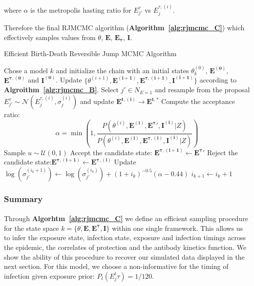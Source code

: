 \documentclass{article}
\begin{document}
where $\alpha$ is the metropolis hasting ratio for $E_{j'}^{\tau}$ vs $E_j^{\tau, (i)}$.

Therefore the final RJMCMC algorithm (\textbf{Algorithm~\ref{alg:rjmcmc_C}}) which effectively samples values from $\theta$, $\mathbf{E}$, $\mathbf{E_\tau}$, $\mathbf{I}$. 

\begin{algorithm}[H]
\caption{Efficient Birth-Death Reversible Jump MCMC Algorithm}
\label{alg:rjmcmc_C}
\begin{algorithmic}[1]
 \State Chose a model $k$ and initialize the chain with an initial states $\theta^{(0)}_{k}$, $\mathbf{E^{(0)}}$, $\mathbf{E^{\tau, (0)}}$ and $\mathbf{I^{(0)}}$.
    	\State Update $\{\theta^{(i + 1)}, \mathbf{E^{(i + 1)}}, \mathbf{E^{\tau, (i + 1)}}, \mathbf{I^{(i + 1)}}\}$ according to \textbf{Algroithm~\ref{alg:rjmcmc_B}}.
        \State Select $j' \in N_{E = 1}$ and resample from the proposal $E_{j'}^{\tau} \sim \mathcal{N}\left(E_{j}^{\tau, (i)}, \sigma^{(i)}_{j}\right)$ and update $\mathbf{E^{t, (i)}} \rightarrow \mathbf{E^{t, *}}$
            \State Compute the acceptance ratio:
        		\[
        		\alpha = \min\left(1, \frac{P(\theta^{(i)}, \mathbf{E^{(i)}}, \mathbf{E^{\tau}'}, \mathbf{I^{(i)}}|Z)}{P(\theta^{(i)}, \mathbf{E^{(i)}}, \mathbf{E^{\tau, (i)}}, \mathbf{I^{(i)}}|Z)} \right)
        			\]
  \State Sample $u \sim \mathcal{U}(0, 1)$
            	\State Accept the candidate state: $\mathbf{E^{\tau, (i + 1)}}  \leftarrow \mathbf{E^{\tau}'} $
        \Else
            \State Reject the candidate state:$\mathbf{E^{\tau, (i + 1)}}  \leftarrow \mathbf{E^{\tau, (i)}} $
        \EndIf 
        \State Update $\log\left(\sigma_{j'}^{(i_k + 1)}\right) \leftarrow \log\left(\sigma_{j'}^{(i_k)}\right) + (1 +  i_k)^{-0.5}(\alpha - 0.44)$
        \State $i_{k + 1} \leftarrow i_k + 1$
            \EndFor
    \EndFor
\end{algorithmic}
\end{algorithm}


\subsubsection{Summary}
\paragraph{}Through \textbf{Algorhtm~\ref{alg:rjmcmc_C}} we define an efficient sampling procedure for the state space $k = \{\theta, \mathbf{E}, \mathbf{E^\tau}, \mathbf{I}\}$ within one single framework. This allows us to infer the exposure state, infection state, exposure and infection timings across the epidemic, the correlates of protection and the antibody kinetics function. We show the ability of this procedure to recover our simulated data displayed in the next section.
 For this model, we choose a non-informative for the timing of infection given exposure prior: $P_t(E_j^t\tau) = 1 / 120$.
\end{document}
